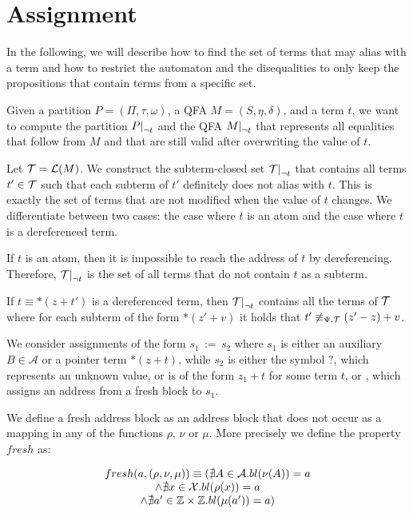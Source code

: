 \section{Assignment}






In the following, we will describe how to find the set of terms that may alias with a term and how to restrict the automaton and the disequalities to only keep the propositions that contain terms from a specific set.

Given a partition $P = (\Pi, \tau, \omega)$, a QFA $M = (S, \eta, \delta)$, and a term $t$, we want to compute the partition $\restr{P}{\neg t}$ and the QFA $\restr{M}{\neg t}$ that represents all equalities that follow from $M$ and that are still valid after overwriting the value of $t$.

Let $\mathcal{T} = \mathcal{L}(M)$. We construct the subterm-closed set $\restr{\T}{\neg t}$ that contains all terms $t' \in \mathcal{T}$ such that each subterm of $t'$ definitely does not alias with $t$.
This is exactly the set of terms that are not modified when the value of $t$ changes.
We differentiate between two cases: the case where $t$ is an atom and the case where $t$ is a dereferenced term.

If $t$ is an atom, then it is impossible to reach the address of $t$ by dereferencing.
Therefore, $\restr{\T}{\neg t}$ is the set of all terms that do not contain $t$ as a subterm.

If $t \equiv *(z + t')$ is a dereferenced term, then $\restr{\T}{\neg t}$ contains all the terms of $\mathcal{T}$ where for each subterm of the form $*(z' + v)$ it holds that $t' \not\equiv_{\Psi,\mathcal{T}} (z' - z) + v$.

We consider assignments of the form $s_1\,{:=}\,s_2$ where $s_1$ is either an auxiliary $B \in \mathcal{A}$ or a pointer term $*(z+t)$, while $s_2$ is either the symbol $?$, which represents an unknown value, or is of the form $z_1 + t$ for some term $t$, or \malloc, which assigns an address from a fresh block to $s_1$.

We define a fresh address block as an address block that does not occur as a mapping in any of the functions $\rho$, $\nu$ or $\mu$. More precisely we define the property $fresh$ as:

\[ \begin{array}{c}
		fresh(a, (\rho,\nu,\mu)) \equiv
		(\nexists A\in \mathcal{A} . bl(\nu(A)) = a     \\
		\land \nexists x\in \mathcal{X}. bl(\rho(x)) = a \\
		\land \nexists a'\in \mathbb{Z} \times \mathbb{Z} . bl(\mu(a')) = a)
	\end{array}
\]


